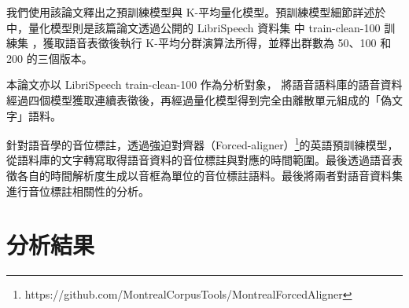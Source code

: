 
我們使用該論文釋出之預訓練模型與 K-平均量化模型。預訓練模型細節詳述於 \cite{lakhotia_generative_2021-1} 中，量化模型則是該篇論文透過公開的 LibriSpeech 資料集 \cite{panayotov_librispeech_2015} 中 train-clean-100 訓練集
，獲取語音表徵後執行 K-平均分群演算法所得，並釋出群數為 50、100 和 200 的三個版本。


本論文亦以 LibriSpeech train-clean-100 作為分析對象，
將語音語料庫的語音資料經過四個模型獲取連續表徵後，再經過量化模型得到完全由離散單元組成的「偽文字」語料。

針對語音學的音位標註，透過強迫對齊器（Forced-aligner）\footnote{https://github.com/MontrealCorpusTools/Montreal­Forced­Aligner}的英語預訓練模型，從語料庫的文字轉寫取得語音資料的音位標註與對應的時間範圍。最後透過語音表徵各自的時間解析度生成以音框為單位的音位標註語料。最後將兩者對語音資料集進行音位標註相關性的分析。

\section{分析結果}

